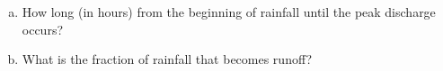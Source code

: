 \documentclass[12pt]{article}
\begin{document}
\begin{enumerate}
\begin{enumerate}[a)]
~\newline
~\newline
~\newline
~\newline
~\newline
\item How long (in hours) from the beginning of rainfall until the peak discharge occurs?
~\newline
~\newline
~\newline
~\newline
~\newline
\item What is the fraction of rainfall that becomes runoff?
\end{enumerate}
\clearpage

\end{enumerate}
\end{document}
